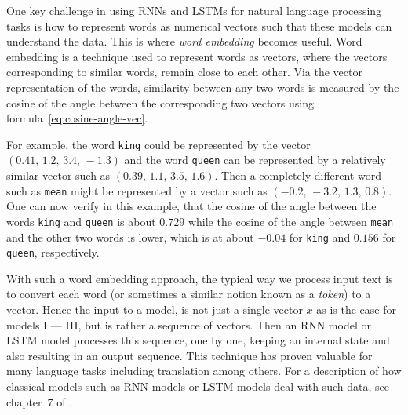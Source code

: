 \documentclass[12pt]{article}
\begin{document}
One key challenge in using RNNs and LSTMs for natural language processing tasks is how to represent words as numerical vectors such that these models can understand the data. This is where {\em word embedding} becomes useful. Word embedding is a technique used to represent words as vectors, where the vectors corresponding to similar words, remain close to each other. Via the vector representation of the words, similarity between any two words is measured by the cosine of the angle between the corresponding two vectors using formula~\eqref{eq:cosine-angle-vec}.  

For example, the word \texttt{king} could be represented by the vector $(0.41, \, 1.2,\, 3.4, \,-1.3)$ and the word \texttt{queen} can be represented by a relatively similar vector such as $(0.39, \, 1.1, \, 3.5, \, 1.6)$. Then a completely different word such as \texttt{mean} might be represented by a vector such as $(-0.2,\, -3.2,\, 1.3,\, 0.8)$. One can now verify in this example, that the cosine of the angle between the words \texttt{king} and \texttt{queen} is about $0.729$ while the cosine of the angle between \texttt{mean} and the other two words is lower, which is at about $-0.04$ for \texttt{king} and $0.156$ for \texttt{queen}, respectively. 

With such a word embedding approach, the typical way we process input text is to convert each word (or sometimes a similar notion known as a {\em token}) to a vector. Hence the input to a model, is not just a single vector $x$ as is the case for models I --- III, but is rather a sequence of vectors. Then an RNN model or LSTM model processes this sequence, one by one, keeping an internal state and also resulting in an output sequence. This technique has proven valuable for many language tasks including translation among others. For a description of how classical models such as RNN models or LSTM models deal with such data,  see chapter~7 of \cite{LiquetMokaNazarathy2024DeepLearning}.
\end{document}
